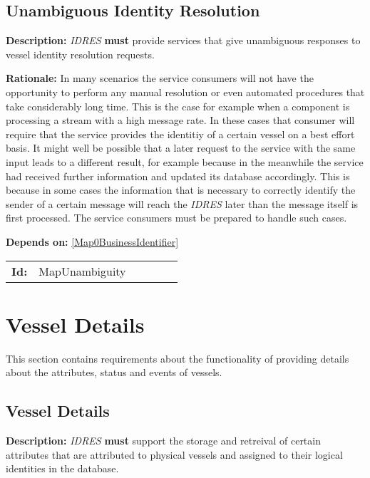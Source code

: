 \subsection{Unambiguous Identity Resolution}\label{MapUnambiguity}
\textbf{Description:} \textsl{IDRES} \textbf{must} provide services that give  unambiguous responses to vessel identity resolution requests.

\textbf{Rationale:} In many scenarios the service consumers will not have the  opportunity to perform any manual resolution or even automated procedures that take considerably long time. This is the case for example when a component is processing a stream with a high message rate. In these cases that consumer will require that the service provides the identitiy of a certain vessel  on a best effort basis. It might well be possible that a later  request to the service with the same input leads to a different result, for example because in the meanwhile the service had received further  information and updated its database accordingly. This is because in some cases the information that is necessary to correctly identify the sender of a  certain message will reach the \textsl{IDRES} later than the message  itself is first processed. The service consumers must be prepared to  handle such cases. 

\textbf{Depends on:} \ref{Map0BusinessIdentifier} 

\par
{\small \begin{center}\begin{tabular}{rlrlrl}
\textbf{Id:} & MapUnambiguity  & & & \end{tabular}\end{center} }

\section{Vessel Details}
This section contains requirements about the functionality of providing details about the attributes, status and events of vessels.
\subsection{Vessel Details}\label{VD0VesselDetails}
\textbf{Description:} \textsl{IDRES} \textbf{must} support the storage and retreival of certain attributes that are attributed to physical vessels and assigned to their logical identities in the database. 

